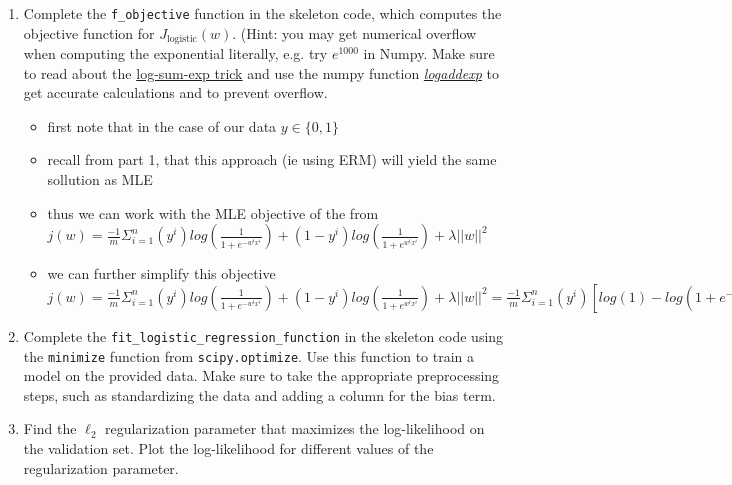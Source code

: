 \documentclass{article}
\theoremstyle{plain}
\theoremstyle{definition}
\begin{document}
\begin{enumerate}
\item Complete the \texttt{f\_objective} function in the skeleton code,
which computes the objective function for $J_{\text{logistic}}(w)$.
(Hint: you may get numerical overflow when computing the exponential literally,
e.g. try $e^{1000}$ in Numpy.
Make sure to read about the
\href{https://blog.feedly.com/tricks-of-the-trade-logsumexp/}{log-sum-exp trick}
and use the numpy function
\textit{ \href{https://docs.scipy.org/doc/numpy/reference/generated/numpy.logaddexp.html}{logaddexp}
}
to get accurate calculations
and to prevent overflow.

\begin{itemize}
    \color{blue}
    \item first note that in the case of our data $y\in \{0,1\}$
    \item recall from part 1, that this approach (ie using ERM) will yield the same sollution as MLE 
    \item thus we can work with the MLE objective of the from $j(w)=\frac{-1}{m}\Sigma_{i=1}^{n}(y^i)log(\frac{1}{1+e^{-w^tx^i}})+(1-y^i)log(\frac{1}{1+e^{w^tx^i}})+\lambda ||w||^2$
    \item we can further simplify this objective$j(w)=\frac{-1}{m}\Sigma_{i=1}^{n}(y^i)log(\frac{1}{1+e^{-w^tx^i}})+(1-y^i)log(\frac{1}{1+e^{w^tx^i}})+\lambda ||w||^2=\frac{-1}{m}\Sigma_{i=1}^{n}(y^i)[log({1})-log({1+e^{-w^tx^i}})]+(1-y^i)[log(1)-log({1+e^{w^tx^i}}))+\lambda ||w||^2=\Sigma_{i=1}^{n}\lambda ||w||^2-(y^i)[log({1+e^{-w^tx^i}})]-(1-y^i)[log({1+e^{w^tx^i}})])=\Sigma_{i=1}^{n}\lambda ||w||^2-(y^i)[log({e^{0}+e^{-w^tx^i}})]-(1-y^i)[log({e^{0}+e^{w^tx^i}})])$
\end{itemize}

\item Complete the \texttt{fit\_logistic\_regression\_function} in the skeleton
code using the \texttt{minimize} function from \texttt{scipy.optimize}.
Use this function to train
a model on the provided data. Make sure to take the appropriate preprocessing
steps, such as standardizing the data and adding a column for the
bias term. 

\item Find the $\ell_{2}$ regularization parameter that maximizes the log-likelihood
on the validation set. Plot the log-likelihood for different values
of the regularization parameter. 


\end{enumerate}
\end{document}
